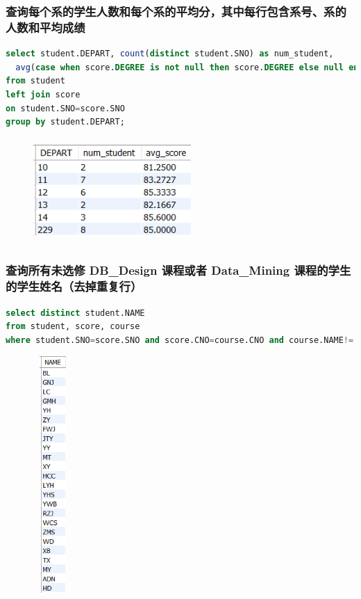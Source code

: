 \documentclass{ctexart}
\begin{document}
\subsubsection{查询每个系的学生人数和每个系的平均分，其中每行包含系号、系的人数和平均成绩}
\begin{lstlisting}[language=sql]
select student.DEPART, count(distinct student.SNO) as num_student,
  avg(case when score.DEGREE is not null then score.DEGREE else null end) as avg_score
from student 
left join score
on student.SNO=score.SNO
group by student.DEPART;

\end{lstlisting}
\begin{figure}[H]
	\centering 
	\includegraphics[height=4cm,width=6cm]{40.png}
	\end{figure}
\subsubsection{查询所有未选修 DB\_Design 课程或者 Data\_Mining 课程的学生的学生姓名（去掉重复行）}
\begin{lstlisting}[language=sql]
select distinct student.NAME
from student, score, course
where student.SNO=score.SNO and score.CNO=course.CNO and course.NAME!='DB_Design' and course.NAME!='Data_Mining';
\end{lstlisting}
\begin{figure}[H]
	\centering 
	\includegraphics[height=9cm,width=1.5cm]{41.png}
	\end{figure}
\end{document}
